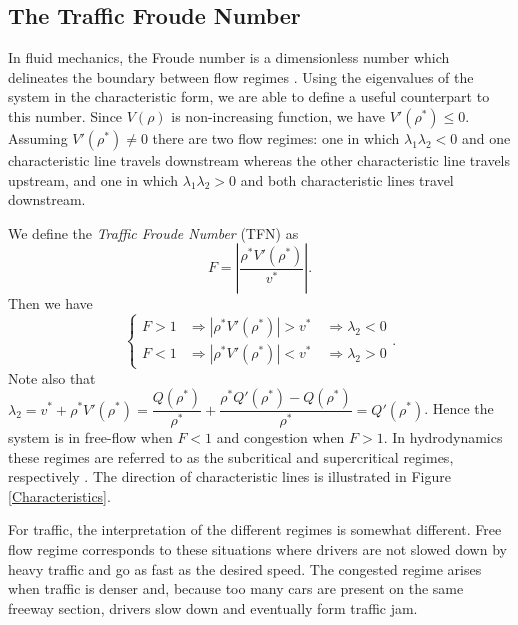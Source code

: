 \documentclass[preprint]{elsarticle}
\begin{document}
\subsection{The Traffic Froude Number}
In fluid mechanics, the Froude number is a dimensionless number which delineates the boundary between flow regimes \cite{Sturm, litrico2009modeling}. Using the eigenvalues of the system in the characteristic form, we are able to define a useful counterpart to this number.
Since $V(\rho)$ is non-increasing function, we have $V'(\rho^*) \leq 0$. Assuming $V'(\rho^*) \neq 0$ there are two flow regimes: one in which $\lambda_1 \lambda_2 < 0$ and one characteristic line travels downstream whereas the other characteristic line travels upstream, and one in which $\lambda_1 \lambda_2 > 0$ and both characteristic lines travel downstream.

We define the \textit{Traffic Froude Number} (TFN) as
\begin{equation}
F = \left\lvert\dfrac{\rho^*V'( \rho^*)}{v^*}\right\rvert.
\end{equation} 
Then we have
\begin{equation*}
\begin{cases}
F > 1 &\Rightarrow |\rho^*V'(\rho^*)| > v^* \quad \Rightarrow \lambda_2  <0 \\
F < 1 &\Rightarrow |\rho^*V'(\rho^*)| < v^* \quad \Rightarrow \lambda_2 > 0
\end{cases}.
\end{equation*}
Note also that $\lambda_2 = v^* + \rho^* V'( \rho^*) = \dfrac{Q(\rho^*)}{\rho^*} + \dfrac{\rho^*Q'(\rho^*)-Q(\rho^*)}{\rho^*} = Q'(\rho^*)$. Hence the system is in free-flow when $F<1$ and congestion when $F>1$. In hydrodynamics these regimes are referred to as the subcritical and supercritical regimes, respectively \cite{litrico2009modeling}. The direction of characteristic lines is illustrated in Figure \ref{Characteristics}.

For traffic, the interpretation of the different regimes is somewhat different. Free flow regime corresponds to these situations where drivers are not slowed down by heavy traffic and go as fast as the desired speed. The congested regime arises when traffic is denser and, because too many cars are present on the same freeway section, drivers slow down and eventually form traffic jam.
\end{document}
